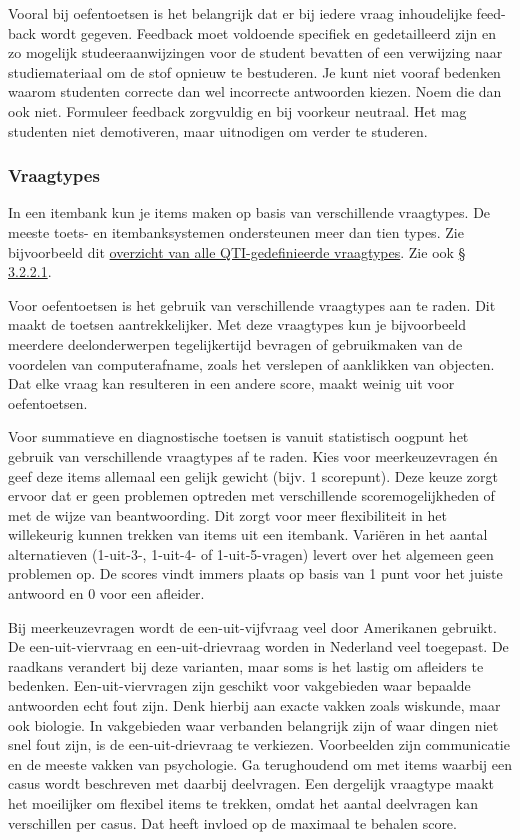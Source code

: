 \documentclass[
]{book}
\begin{document}
Vooral bij oefentoetsen is het belangrijk dat er bij iedere vraag inhoudelijke feed- back wordt gegeven. Feedback moet voldoende specifiek en gedetailleerd zijn en zo mogelijk studeeraanwijzingen voor de student bevatten of een verwijzing naar studiemateriaal om de stof opnieuw te bestuderen. Je kunt niet vooraf bedenken
waarom studenten correcte dan wel incorrecte antwoorden kiezen. Noem die dan ook niet. Formuleer feedback zorgvuldig en bij voorkeur neutraal. Het mag studenten niet demotiveren, maar uitnodigen om verder te studeren.

\hypertarget{vraagtypes}{%
\subsubsection{Vraagtypes}\label{vraagtypes}}

In een itembank kun je items maken op basis van verschillende vraagtypes. De meeste toets- en itembanksystemen ondersteunen meer dan tien types. Zie bijvoorbeeld dit \href{https://webapps.ph.ed.ac.uk/qtiworks/anonymous/samples\#cat1}{overzicht van alle QTI-gedefinieerde vraagtypes}. Zie ook \protect\hyperlink{qti-standaard}{§ 3.2.2.1}.

Voor oefentoetsen is het gebruik van verschillende vraagtypes aan te raden. Dit maakt de toetsen aantrekkelijker. Met deze vraagtypes kun je bijvoorbeeld meerdere deelonderwerpen tegelijkertijd bevragen of gebruikmaken van de voordelen van
computerafname, zoals het verslepen of aanklikken van objecten. Dat elke vraag kan resulteren in een andere score, maakt weinig uit voor oefentoetsen.

Voor summatieve en diagnostische toetsen is vanuit statistisch oogpunt het gebruik van verschillende vraagtypes af te raden. Kies voor meerkeuzevragen én geef deze items allemaal een gelijk gewicht (bijv. 1 scorepunt). Deze keuze zorgt ervoor dat er geen problemen optreden met verschillende scoremogelijkheden of met de wijze van beantwoording. Dit zorgt voor meer flexibiliteit in het willekeurig kunnen trekken van items uit een itembank. Variëren in het aantal alternatieven (1-uit-3-, 1-uit-4- of 1-uit-5-vragen) levert over het algemeen geen problemen op. De scores vindt immers plaats op basis van 1 punt voor het juiste antwoord en 0 voor een afleider.

Bij meerkeuzevragen wordt de een-uit-vijfvraag veel door Amerikanen gebruikt. De een-uit-viervraag en een-uit-drievraag worden in Nederland veel toegepast. De raadkans verandert bij deze varianten, maar soms is het lastig om afleiders te bedenken. Een-uit-viervragen zijn geschikt voor vakgebieden waar bepaalde antwoorden echt fout zijn. Denk hierbij aan exacte vakken zoals wiskunde, maar ook biologie. In vakgebieden waar verbanden belangrijk zijn of waar dingen niet snel fout zijn, is de een-uit-drievraag te verkiezen. Voorbeelden zijn communicatie en de meeste vakken van psychologie. Ga terughoudend om met items waarbij een casus wordt beschreven met daarbij deelvragen. Een dergelijk vraagtype maakt het moeilijker om flexibel items te trekken, omdat het aantal deelvragen kan verschillen per casus. Dat heeft invloed op de maximaal te behalen score.
\end{document}

